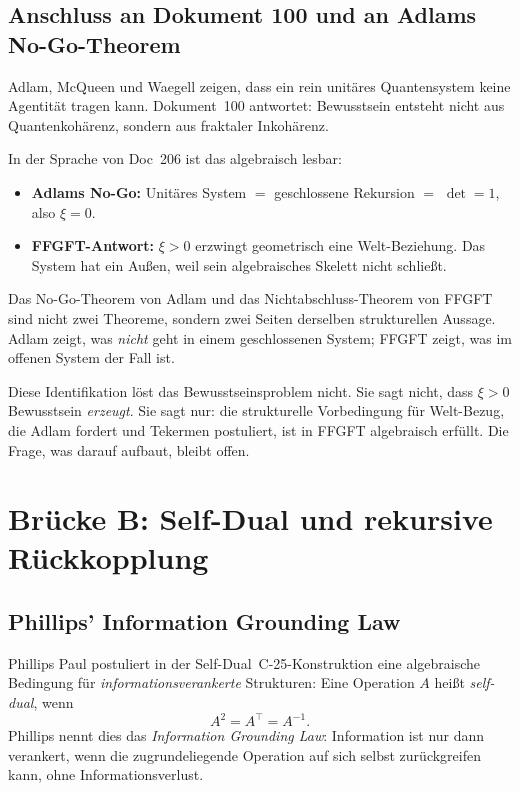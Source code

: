\subsection{Anschluss an Dokument 100 und an Adlams No-Go-Theorem}

Adlam, McQueen und Waegell zeigen, dass ein rein unitäres Quantensystem keine Agentität tragen kann. Dokument~100 antwortet: Bewusstsein entsteht nicht aus Quantenkohärenz, sondern aus fraktaler Inkohärenz.

In der Sprache von Doc~206 ist das algebraisch lesbar:

\begin{itemize}
\item \textbf{Adlams No-Go:} Unitäres System $=$ geschlossene Rekursion $=$ $\det = 1$, also $\xi = 0$.
\item \textbf{FFGFT-Antwort:} $\xi > 0$ erzwingt geometrisch eine Welt-Beziehung. Das System hat ein Außen, weil sein algebraisches Skelett nicht schließt.
\end{itemize}

Das No-Go-Theorem von Adlam und das Nichtabschluss-Theorem von FFGFT sind nicht zwei Theoreme, sondern zwei Seiten derselben strukturellen Aussage. Adlam zeigt, was \emph{nicht} geht in einem geschlossenen System; FFGFT zeigt, was im offenen System der Fall ist.

\begin{interpretation}
Diese Identifikation löst das Bewusstseinsproblem nicht. Sie sagt nicht, dass $\xi > 0$ Bewusstsein \emph{erzeugt}. Sie sagt nur: die strukturelle Vorbedingung für Welt-Bezug, die Adlam fordert und Tekermen postuliert, ist in FFGFT algebraisch erfüllt. Die Frage, was darauf aufbaut, bleibt offen.
\end{interpretation}

\section{Brücke B: Self-Dual und rekursive Rückkopplung}\label{sec:brueckeB}

\subsection{Phillips' Information Grounding Law}

Phillips Paul postuliert in der Self-Dual~C-25-Konstruktion eine algebraische Bedingung für \emph{informationsverankerte} Strukturen: Eine Operation $A$ heißt \emph{self-dual}, wenn
\begin{equation}
A^2 = A^\top = A^{-1}.
\end{equation}
Phillips nennt dies das \emph{Information Grounding Law}: Information ist nur dann verankert, wenn die zugrundeliegende Operation auf sich selbst zurückgreifen kann, ohne Informationsverlust.

